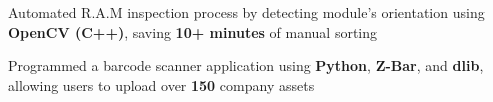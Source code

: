 \begin{siderules}
\begin{cventries}
{\begin{cvitems}
          \item {Automated R.A.M inspection process by detecting module's orientation using \textbf{OpenCV (C++)}, saving \textbf{10+ minutes} of manual sorting}
          \item {Programmed a barcode scanner application using \textbf{Python}, \textbf{Z-Bar}, and \textbf{dlib}, allowing users to upload over \textbf{150} company assets }
        \end{cvitems}
      }
  \end{cventries}
\end{siderules}
